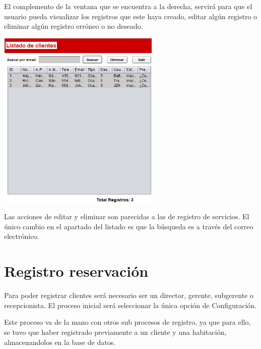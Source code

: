 \documentclass[12pt]{article}
\begin{document}
\begin{flushleft}
\vspace{0.5cm}
\textsf{El complemento de la ventana que se encuentra a la derecha, servirá para que el usuario pueda visualizar los registros que este haya creado, editar algún registro o eliminar algún registro erróneo o no deseado.}
\vspace{0.5cm}
\begin{center}
\includegraphics[width=7.75cm]{re_cliente.png}
\end{center}

\vspace{0.5cm}
\textsf{Las acciones de editar y eliminar son parecidas a las de registro de servicios. El único cambio en el apartado del listado es que la búsqueda es a través del correo electrónico.}



\section{Registro reservación}
\textsf{Para poder registrar clientes será necesario ser un director, gerente, subgerente o recepcionista. El proceso inicial será seleccionar la única opción de Configuración.}

\vspace{0.5cm}
\textsf{Este proceso va de la mano con otros sub procesos de registro, ya que para ello, se tuvo que haber registrado previamente a un cliente y una habitación, almacenandolos en la base de datos.}


\end{flushleft}
\end{document}
